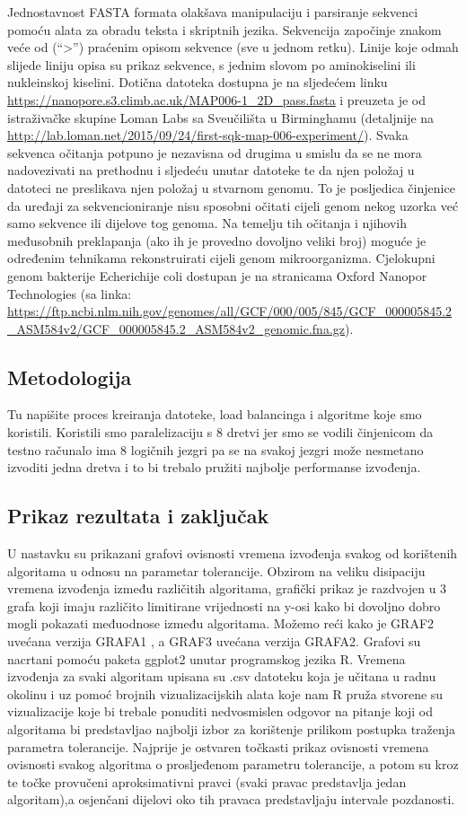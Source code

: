 \documentclass[conference]{IEEEtran}
\begin{document}
Jednostavnost FASTA formata olakšava manipulaciju i parsiranje sekvenci pomoću alata za obradu teksta i skriptnih jezika. Sekvencija započinje znakom veće od (“>”) praćenim opisom sekvence (sve u jednom retku). Linije koje odmah slijede liniju opisa su prikaz sekvence, s jednim slovom po aminokiselini ili nukleinskoj kiselini. Dotična datoteka dostupna je na sljedećem linku \url{https://nanopore.s3.climb.ac.uk/MAP006-1_2D_pass.fasta} i preuzeta je od istraživačke skupine Loman Labs sa Sveučilišta u Birminghamu (detaljnije na \url{http://lab.loman.net/2015/09/24/first-sqk-map-006-experiment/}). Svaka sekvenca očitanja potpuno je nezavisna od drugima u smislu da se ne mora nadovezivati na prethodnu i sljedeću unutar datoteke te da njen položaj u datoteci ne preslikava njen položaj u stvarnom genomu. To je posljedica činjenice da uređaji za sekvencioniranje nisu sposobni očitati cijeli genom nekog uzorka već samo sekvence ili dijelove tog genoma. Na temelju tih očitanja  i njihovih međusobnih preklapanja (ako ih je provedno dovoljno veliki broj) moguće je određenim tehnikama rekonstruirati cijeli genom mikroorganizma. Cjelokupni genom bakterije Echerichije coli dostupan je na stranicama Oxford Nanopor Technologies (sa linka: \url{https://ftp.ncbi.nlm.nih.gov/genomes/all/GCF/000/005/845/GCF_000005845.2_ASM584v2/GCF_000005845.2_ASM584v2_genomic.fna.gz}). 

\subsection{Metodologija}
Tu napišite proces kreiranja datoteke, load balancinga i algoritme koje smo koristili.
Koristili smo paralelizaciju s 8 dretvi jer smo se vodili činjenicom da testno računalo ima 8 logičnih jezgri pa se na svakoj jezgri može nesmetano izvoditi jedna dretva i to bi trebalo pružiti najbolje performanse izvođenja.

\subsection{Prikaz rezultata i zaključak}
U nastavku su prikazani grafovi ovisnosti vremena izvođenja svakog od korištenih algoritama u odnosu na parametar tolerancije. Obzirom na veliku disipaciju vremena izvođenja između različitih algoritama, grafički prikaz je razdvojen u 3 grafa koji imaju različito limitirane vrijednosti na y-osi kako bi dovoljno dobro mogli pokazati međuodnose između algoritama. Možemo reći kako je GRAF2 uvećana verzija GRAFA1 , a GRAF3 uvećana verzija GRAFA2.
Grafovi su nacrtani pomoću paketa ggplot2 unutar programskog jezika R. Vremena izvođenja za svaki algoritam upisana su .csv datoteku koja je učitana u radnu okolinu i uz pomoć brojnih vizualizacijskih alata koje nam R pruža stvorene su vizualizacije koje bi trebale ponuditi nedvosmislen odgovor na pitanje koji od algoritama bi predstavljao najbolji izbor za korištenje prilikom postupka traženja parametra tolerancije. Najprije je ostvaren točkasti prikaz ovisnosti vremena ovisnosti svakog algoritma o prosljeđenom parametru tolerancije, a potom su kroz te točke provučeni aproksimativni pravci (svaki pravac predstavlja jedan algoritam),a osjenčani dijelovi oko tih pravaca predstavljaju intervale pozdanosti.
\end{document}
